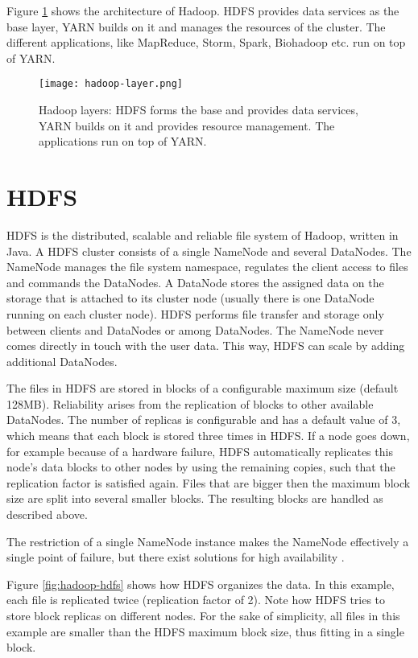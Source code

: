 Figure \ref{fig:hadoop-layer} shows the architecture of Hadoop. HDFS provides data services as the base layer, YARN builds on it and manages the resources of the cluster. The different applications, like MapReduce, Storm, Spark, Biohadoop etc. run on top of YARN.

\begin{figure}[ht!]
  \centering
  \texttt{[image: hadoop-layer.png]}
  \caption{Hadoop layers: HDFS forms the base and provides data services, YARN builds on it and provides resource management. The applications run on top of YARN.}
  \label{fig:hadoop-layer}
\end{figure}

\section{HDFS}
HDFS is the distributed, scalable and reliable file system of Hadoop, written in Java. A HDFS cluster consists of a single NameNode and several DataNodes. The NameNode manages the file system namespace, regulates the client access to files and commands the DataNodes. A DataNode stores the assigned data on the storage that is attached to its cluster node (usually there is one DataNode running on each cluster node). HDFS performs file transfer and storage only between clients and DataNodes or among DataNodes. The NameNode never comes directly in touch with the user data. This way, HDFS can scale by adding additional DataNodes.

The files in HDFS are stored in blocks of a configurable maximum size (default 128MB). Reliability arises from the replication of blocks to other available DataNodes. The number of replicas is configurable and has a default value of 3, which means that each block is stored three times in HDFS. If a node goes down, for example because of a hardware failure, HDFS automatically replicates this node's data blocks to other nodes by using the remaining copies, such that the replication factor is satisfied again. Files that are bigger then the maximum block size are split into several smaller blocks. The resulting blocks are handled as described above.

The restriction of a single NameNode instance makes the NameNode effectively a single point of failure, but there exist solutions for high availability \cite{hdfs-ha-qjm}\cite{hdfs-ha-nfs}.

Figure \ref{fig:hadoop-hdfs} shows how HDFS organizes the data. In this example, each file is replicated twice (replication factor of 2). Note how HDFS tries to store block replicas on different nodes. For the sake of simplicity, all files in this example are smaller than the HDFS maximum block size, thus fitting in a single block.

